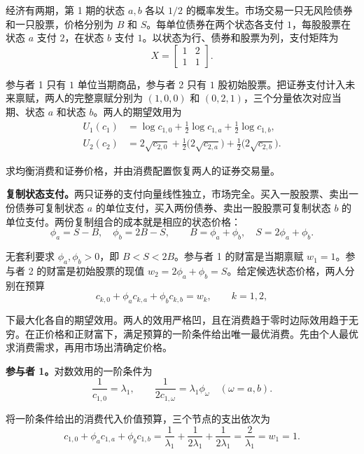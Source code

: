 \begin{tcolorbox}[example]
\begin{question}
 经济有两期，第 1 期的状态 $a,b$ 各以 $1/2$ 的概率发生。市场交易一只无风险债券和一只股票，价格分别为 $B$ 和 $S$。每单位债券在两个状态各支付 $1$，每股股票在状态 $a$ 支付 $2$，在状态 $b$ 支付 $1$。以状态为行、债券和股票为列，支付矩阵为
\[
 X=\begin{bmatrix}1&2\\1&1\end{bmatrix}.
\]

参与者 1 只有 $1$ 单位当期商品，参与者 2 只有 $1$ 股初始股票。把证券支付计入未来禀赋，两人的完整禀赋分别为 $(1,0,0)$ 和 $(0,2,1)$，三个分量依次对应当期、状态 $a$ 和状态 $b$。两人的期望效用为
\[
 \begin{aligned}
 U_1(c_1)&=\log c_{1,0}+\tfrac12\log c_{1,a}+\tfrac12\log c_{1,b},\\
 U_2(c_2)&=2\sqrt{c_{2,0}}+\tfrac12\bigl(2\sqrt{c_{2,a}}\bigr)
                         +\tfrac12\bigl(2\sqrt{c_{2,b}}\bigr).
 \end{aligned}
\]

求均衡消费和证券价格，并由消费配置恢复两人的证券交易量。
\end{question}
\begin{solution}[blank-type=manual,blank-vsep=7\baselineskip]
\textbf{复制状态支付。}两只证券的支付向量线性独立，市场完全。买入一股股票、卖出一份债券可复制状态 $a$ 的单位支付，买入两份债券、卖出一股股票可复制状态 $b$ 的单位支付。两份复制组合的成本就是相应的状态价格：
\[
 \phi_a=S-B,\quad\phi_b=2B-S,\qquad
 B=\phi_a+\phi_b,\quad S=2\phi_a+\phi_b.
\]

无套利要求 $\phi_a,\phi_b>0$，即 $B<S<2B$。参与者 1 的财富是当期禀赋 $w_1=1$。参与者 2 的财富是初始股票的现值 $w_2=2\phi_a+\phi_b=S$。给定候选状态价格，两人分别在预算
\[
 c_{k,0}+\phi_a c_{k,a}+\phi_b c_{k,b}=w_k,\qquad k=1,2,
\]

下最大化各自的期望效用。两人的效用严格凹，且在消费趋于零时边际效用趋于无穷。在正价格和正财富下，满足预算的一阶条件给出唯一最优消费。先由个人最优求消费需求，再用市场出清确定价格。

\textbf{参与者 1。}对数效用的一阶条件为
\[
 \frac1{c_{1,0}}=\lambda_1,\qquad
 \frac1{2c_{1,\omega}}=\lambda_1\phi_\omega
 \quad(\omega=a,b).
\]

将一阶条件给出的消费代入价值预算，三个节点的支出依次为
\[
 c_{1,0}+\phi_a c_{1,a}+\phi_b c_{1,b}
 =\frac{1}{\lambda_1}+\frac{1}{2\lambda_1}+\frac{1}{2\lambda_1}
 =\frac{2}{\lambda_1}=w_1=1.
\]


\end{solution}
\end{tcolorbox}

